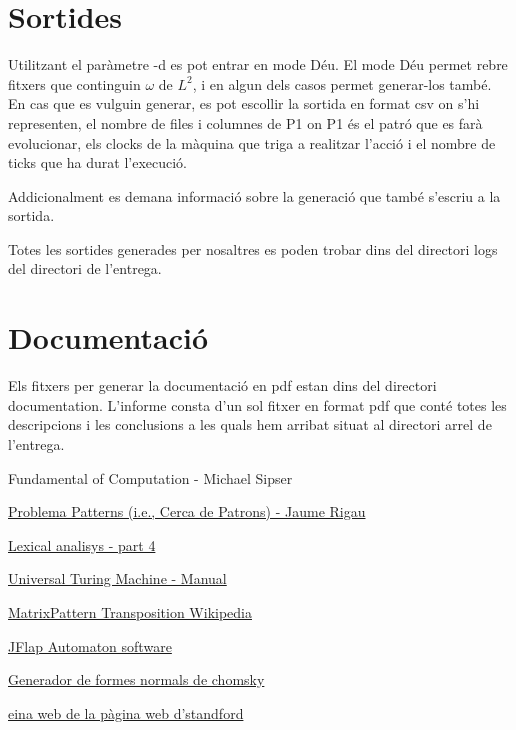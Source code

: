 \documentclass[12pt,a4paper]{report}
\def \w{$\omega$}
\def \ld{$L^{2}$}
\begin{document}
\section{Sortides}

Utilitzant el paràmetre -d es pot entrar en mode Déu. El mode Déu permet rebre fitxers que continguin \w{} de \ld{}, i en algun dels casos permet generar-los també. En cas que es vulguin generar, es pot escollir la sortida en format csv on s'hi representen, el nombre de files i columnes de P1 on P1 és el patró que es farà evolucionar, els clocks de la màquina que triga a realitzar l'acció i el nombre de ticks que ha durat l'execució.

Addicionalment es demana informació sobre la generació que també s'escriu a la sortida.

Totes les sortides generades per nosaltres es poden trobar dins del directori logs del directori de l'entrega.

\section{Documentació}

Els fitxers per generar la documentació en pdf estan dins del directori documentation. L'informe consta d'un sol fitxer en format pdf que conté totes les descripcions i les conclusions a les quals hem arribat situat al directori arrel de l'entrega.

\begin{thebibliography}{9}
Fundamental of Computation - Michael Sipser

\href{http://ima.udg.edu/~rigau/FC/FC_patterns.pdf}{Problema Patterns (i.e., Cerca de Patrons) - Jaume Rigau}

\href{http://ima.udg.edu/~rigau/FC/MFAP.pdf}{Lexical analisys - part 4}

\href{http://ima.udg.edu/~rigau/FC/utm_read_me.pdf}{Universal Turing Machine - Manual}

\href{https://en.wikipedia.org/wiki/Transpose}{MatrixPattern Transposition Wikipedia}

\href{http://www.jflap.org/}{JFlap Automaton software}

\href{https://mpeveler.com/assets/content/projects/cfg2cnf.php}{Generador de formes normals de chomsky}

\href{https://web.stanford.edu/class/archive/cs/cs103/cs103.1156/tools/cfg/}{eina web de la pàgina web d’standford}

\end{thebibliography}

\printindex
\end{document}
